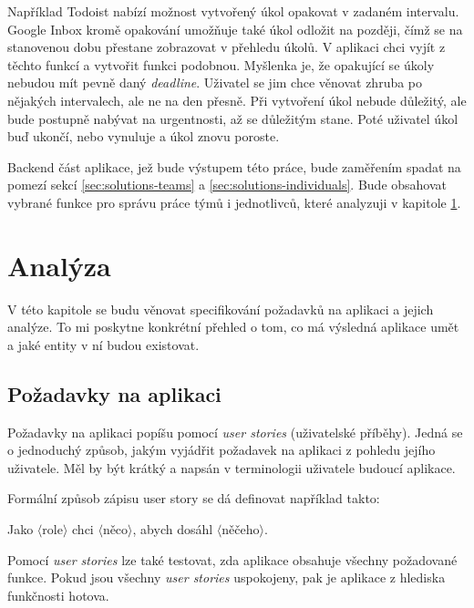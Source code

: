\documentclass[thesis=B,czech]{FITthesis}[2012/06/26]
\begin{document}
		Například Todoist nabízí možnost vytvořený úkol opakovat v zadaném intervalu. Google Inbox kromě opakování umožňuje také úkol odložit na později, čímž se na stanovenou dobu přestane zobrazovat v přehledu úkolů. V aplikaci chci vyjít z těchto funkcí a vytvořit funkci podobnou. Myšlenka je, že opakující se úkoly nebudou mít pevně daný \textit{deadline}. Uživatel se jim chce věnovat zhruba po nějakých intervalech, ale ne na den přesně. Při vytvoření úkol nebude důležitý, ale bude postupně nabývat na urgentnosti, až se důležitým stane. Poté uživatel úkol buď ukončí, nebo vynuluje a úkol znovu poroste.
		
		Backend část aplikace, jež bude výstupem této práce, bude zaměřením spadat na pomezí sekcí \ref{sec:solutions-teams} a \ref{sec:solutions-individuals}. Bude obsahovat vybrané funkce pro správu práce týmů i jednotlivců, které analyzuji v kapitole \ref{chapter:analysis}.

	
\chapter{Analýza}
	\label{chapter:analysis}
	
	V této kapitole se budu věnovat specifikování požadavků na aplikaci a jejich analýze. To mi poskytne konkrétní přehled o tom, co má výsledná aplikace umět a jaké entity v ní budou existovat.
	
	\section{Požadavky na aplikaci}
		Požadavky na aplikaci popíšu pomocí \textit{user stories} (uživatelské příběhy)\cite{user-stories}. Jedná se o jednoduchý způsob, jakým vyjádřit požadavek na aplikaci z pohledu jejího uživatele. Měl by být krátký a napsán v terminologii uživatele budoucí aplikace.
		
		Formální způsob zápisu user story se dá definovat \cite{user-stories-applied-book} například takto:
		\begin{center}
			Jako $\langle$role$\rangle$ chci $\langle$něco$\rangle$, abych dosáhl $\langle$něčeho$\rangle$.
		\end{center}
		Pomocí \textit{user stories} lze také testovat, zda aplikace obsahuje všechny požadované funkce. Pokud jsou všechny \textit{user stories} uspokojeny, pak je aplikace z hlediska funkčnosti hotova.
		
\end{document}
